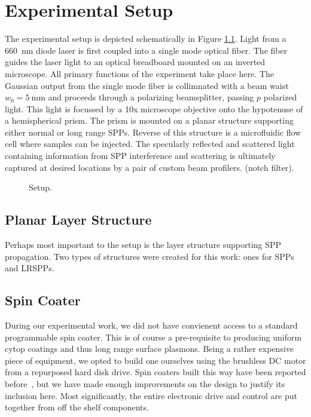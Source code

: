 \documentclass[a4paper,titlepage,onecolumn]{report}
\newcommand{\Figure}[1]{Figure \ref{#1}}
\begin{document}
\chapter{Experimental Setup}
\label{ch:expsetup}

The experimental setup is depicted schematically in
\Figure{fig:sppexperimentalsetup}.  Light from a \SI{660}{\nano\meter}
diode laser is first coupled into a single mode optical fiber.  The fiber
guides the laser light to an optical breadboard mounted on an inverted
microscope.  All primary functions of the experiment take place here.  The
Gaussian output from the single mode fiber is collimnated with a beam waist
$w_0=\SI{5}{\milli\meter}$ and proceeds
through a polarizing beamsplitter, passing $p$ polarized light.  This light
is focussed by a 10x microscope objective onto the
hypotenuse of a hemispherical prism.  The prism is mounted on a planar
structure supporting either normal or long range SPPs.  Reverse of this
structure is a microfluidic flow cell where samples can be injected.  The
specularly reflected and scattered light containing information from SPP
interference and scattering is ultimately captured at desired locations by
a pair of custom beam profilers. (notch filter).
\begin{figure}
 \caption{Setup.}
 \label{fig:sppexperimentalsetup}
\end{figure}

\section{Planar Layer Structure}
Perhaps most important to the setup is the layer structure supporting SPP
propagation.  Two types of structures were created for this work: ones for
SPPs and LRSPPs.


\section{Spin Coater}
During our experimental work, we did not have convienent access to a
standard programmable spin coater.  This is of course a pre-requisite to
producing uniform cytop coatings and thus long range surface plasmons.
Being a rather expensive piece of equipment, we opted to build one
ourselves using the brushless DC motor from a repurposed hard disk drive.
Spin coaters built this way have been reported
before~\cite{bianchi2006spin}, but we have made enough improvements on the
design to justify its inclusion here.  Most significantly, the entire
electronic drive and control are put together from off the shelf
components.
\end{document}
